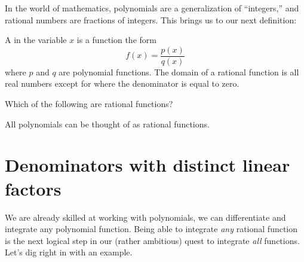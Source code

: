 \documentclass{ximera}
\begin{document}
In the world of mathematics, polynomials are a generalization of
``integers,'' and rational numbers are fractions of integers. This
brings us to our next definition:

\begin{definition}
  A  in the variable $x$ is a function the form
  \[
  f(x) = \frac{p(x)}{q(x)}
  \]
  where $p$ and $q$ are polynomial functions. The domain of a rational
  function is all real numbers except for where the denominator is
  equal to zero.
\end{definition}

\begin{question}
  Which of the following are rational functions?
  \begin{selectAll}
  \end{selectAll}
  \begin{feedback}
    All polynomials can be thought of as rational functions.
  \end{feedback}
\end{question}


\section{Denominators with distinct linear factors}


We are already skilled at working with polynomials, we can
differentiate and integrate any polynomial function. Being able to
integrate \textit{any} rational function is the next logical step in
our (rather ambitious) quest to integrate \textit{all}
functions. Let's dig right in with an example.
\end{document}
